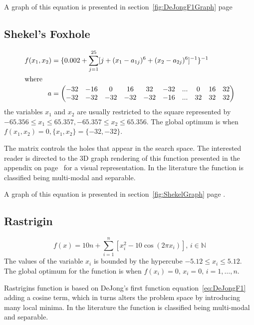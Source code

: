 A graph of this equation is presented in section~\ref{fig:DeJongF1Graph} page \pageref{fig:DeJongF1Graph}
\subsection{Shekel's Foxhole}
\begin{align}
\label{eq:shekel}
	f(x_1,x_2) &= \{0.002 + \sum^{25}_{j=1} [j + (x_1 - a_{1j})^6 + (x_2 - a_{2j})^6]^{-1}\}^{-1}\\
\intertext{where}
	a &= \begin{pmatrix} \nonumber
			-32 & -16 & 0 & 16 & 32 & -32 & ... & 0 & 16 & 32 \\
			-32 & -32 & -32 & -32 & -32 & -16 & ... & 32 & 32 & 32 \\
		 \end{pmatrix}
\end{align}
the variables $x_1$ and $x_2$ are usually restricted to the square represented by $-65.356 \leq x_1 \leq 65.357, -65.357 \leq x_2 \leq 65.356$\cite{ABCCompareStudy,TSGlobalOptimization,ContinACSTS,TestFunctions}. The global optimum is when $f(x_1,x_2) = 0, \{x_1,x_2\} = \{-32,-32\}$\cite{ABCCompareStudy,TSGlobalOptimization,ContinACSTS,TestFunctions}.

The matrix controls the holes that appear in the search space. The interested reader is directed to the 3D graph rendering of this function presented in the appendix on page~\pageref{fig:ShekelGraph} for a visual representation. In the literature the function is classified being multi-modal and separable\cite{adaptPSO,ABCCompareStudy,TestFunctions}.

A graph of this equation is presented in section~\ref{fig:ShekelGraph} page \pageref{fig:ShekelGraph}.
\subsection{Rastrigin}
\begin{equation}
	f(x) = 10n + \sum_{i=1}^n [x_i^2 - 10\cos(2 \pi x_i)],\, i \in \mathbb{N}
\end{equation}
The values of the variable $x_i$ is bounded by the hypercube $-5.12 \leq x_i \leq 5.12$\cite{adaptPSO,ABCCompareStudy,numericalABC,ARPSO,PerfABC,HybridIntelliGA,TestFunctions}. The global optimum for the function is when $f(x_i) = 0,\, x_i = 0, \, i = 1,\dots,n$\cite{adaptPSO,ABCCompareStudy,numericalABC,HybridIntelliGA,TestFunctions}.

Rastrigins function is based on DeJong's first function equation~\ref{eq:DeJongF1} adding a cosine term, which in turns alters the problem space by introducing many local minima\cite{numericalABC,PerfABC,HybridIntelliGA,TestFunctions}. In the literature the function is classified being multi-modal and separable\cite{adaptPSO,ABCCompareStudy,numericalABC,ARPSO,ChaoticABC,PerfABC,HybridIntelliGA,TestFunctions}.

